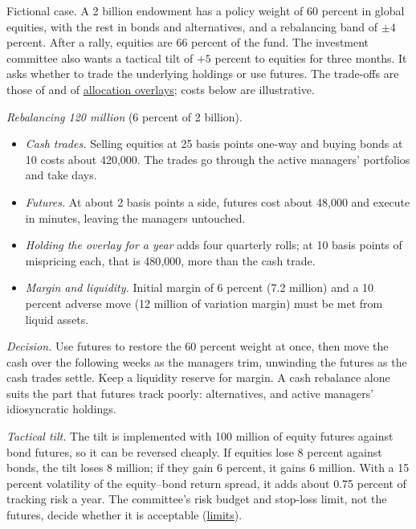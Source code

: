 \begin{qfexample}\label{ex:endowment-derivative-overlay-case}
 Fictional case. A 2 billion endowment has a policy weight of 60 percent in global equities, with the rest in bonds and alternatives, and a rebalancing band of $\pm4$ percent. After a rally, equities are 66 percent of the fund. The investment committee also wants a tactical tilt of $+5$ percent to equities for three months. It asks whether to trade the underlying holdings or use futures. The trade-offs are those of \citep[chap.~11, sec.~3.4, pp.~715--716]{managing-investment-portfolios-2007} and of \hyperref[meth:derivative-overlay-allocation]{allocation overlays}; costs below are illustrative.

 \emph{Rebalancing 120 million} (6 percent of 2 billion).
\begin{itemize}
\item \emph{Cash trades.} Selling equities at 25 basis points one-way and buying bonds at 10 costs about 420{,}000. The trades go through the active managers' portfolios and take days.
\item \emph{Futures.} At about 2 basis points a side, futures cost about 48{,}000 and execute in minutes, leaving the managers untouched.
\item \emph{Holding the overlay for a year} adds four quarterly rolls; at 10 basis points of mispricing each, that is 480{,}000, more than the cash trade.
\item \emph{Margin and liquidity.} Initial margin of 6 percent (7.2 million) and a 10 percent adverse move (12 million of variation margin) must be met from liquid assets.
\end{itemize}
\emph{Decision.} Use futures to restore the 60 percent weight at once, then move the cash over the following weeks as the managers trim, unwinding the futures as the cash trades settle. Keep a liquidity reserve for margin. A cash rebalance alone suits the part that futures track poorly: alternatives, and active managers' idiosyncratic holdings.

\emph{Tactical tilt.} The tilt is implemented with 100 million of equity futures against bond futures, so it can be reversed cheaply. If equities lose 8 percent against bonds, the tilt loses 8 million; if they gain 6 percent, it gains 6 million. With a 15 percent volatility of the equity--bond return spread, it adds about 0.75 percent of tracking risk a year. The committee's risk budget and stop-loss limit, not the futures, decide whether it is acceptable (\hyperref[meth:market-risk-limits-capital]{limits}).


\end{qfexample}
